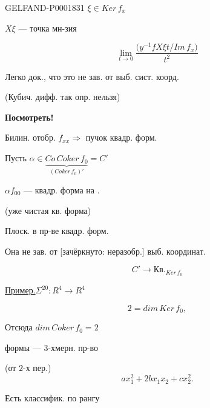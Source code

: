 \begin{GelfandAdjacentEvidence}{GELFAND-P000183}{1}
$\xi\in Ker\,f_x$

$X\xi$ — точка мн-зия

\begin{equation*}\lim_{t\to0}\frac{\bigl(y^{-1}fX\xi t/Im\,f_x\bigr)}{t^2}\end{equation*}

Легко док., что это не зав. от выб. сист. коорд.

(Кубич. дифф. так опр. нельзя)

\textbf{Посмотреть!}

Билин. отобр. $f_{xx}\Longrightarrow$ пучок квадр. форм.

Пусть $\alpha\in\underbrace{Co\,Coker\,f_0}_{(Coker\,f_0)'}=C'$

$\alpha f_{00}$ — квадр. форма на .

(уже чистая кв. форма)

Плоск. в пр-ве квадр. форм.

Она не зав. от [зачёркнуто: неразобр.] выб. координат.
\end{GelfandAdjacentEvidence}

\begin{equation*}C'\longrightarrow\text{Кв.}_{Ker\,f_0}\end{equation*}

\underline{Пример.}\qquad $\Sigma^{20}:R^4\longrightarrow R^4$

\begin{equation*}2=dim\,Ker\,f_0,\end{equation*}

Отсюда $dim\,Coker\,f_0=2$

формы — $3$-хмерн. пр-во

(от $2$-х пер.)
\begin{equation*}ax_1^2+2bx_1x_2+cx_2^2.\end{equation*}

Есть классифик. по рангу




